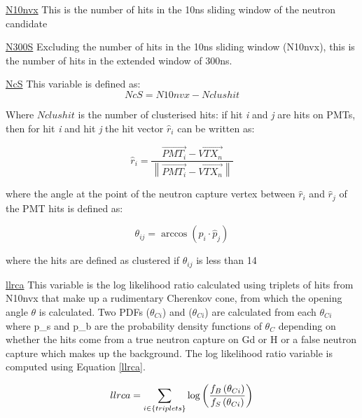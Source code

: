 \underline{N10nvx}
\newline
This is the number of hits in the 10ns sliding window of the neutron candidate
\newline


\underline{N300S}
\newline
Excluding the number of hits in the 10ns sliding window (N10nvx), this is the number of hits in the extended window of 300ns.
\newline


\underline{NcS}
\newline
This variable is defined as:
\begin{equation}
\label{ncs}
    NcS = N10nvx - Nclushit
\end{equation}

    Where $Nclushit$ is the number of clusterised hits: if hit \textit{i} and \textit{j} are hits on PMTs, then for hit \textit{i} and hit \textit{j} the hit vector $\hat{r}_i$ can be written as:

\begin{equation}
\label{hit}
    \hat{r}_{i}=\frac{\overrightarrow{P M T_{i}}-\overrightarrow{V T X_{n}}}{\left\|\overrightarrow{P M T_{i}}-\overrightarrow{V T X_{n}}\right\|}
\end{equation}

where the angle at the point of the neutron capture vertex between $\hat{r}_{i}$ and $\hat{r}_{j}$ of the PMT hits is defined as:

\begin{equation}
\theta_{i j}=\arccos \left(\hat{p}_{i} \cdot \hat{p}_{j}\right)
\end{equation}

where the hits are defined as clustered if $\theta_{ij}$ is less than 14


\underline{llrca}
\newline
This variable is the log likelihood ratio calculated using triplets of hits from N10nvx that make up a rudimentary Cherenkov cone, from which the opening angle $\theta$ is calculated. Two PDFs ($\theta_{Ci}$) and ($\theta_{Ci}$) are calculated from each $\theta_{Ci}$ where p\_s and p\_b are the probability density functions of $\theta_{C}$ depending on whether the hits come from a true neutron capture on Gd or H or a false neutron capture which makes up the background. The log likelihood ratio variable is computed using Equation {\ref{llrca}}.

\begin{equation}
\label{llrca}
\newline
  llrca =\sum_{i \in\{ { triplets }\}} \log \left(\frac{f_{B}\left(\theta_{C i}\right)}{f_{S}\left(\theta_{C i}\right)}\right)
\end{equation}


